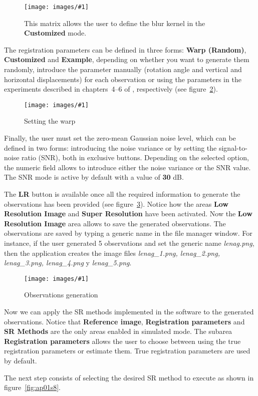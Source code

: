 \documentclass[11pt,a4paper]{article}
\newcommand{\figureimage}[4]{%
\begin{figure}[t]%
\begin{center}%
\texttt{[image: images/\#1]}%
\caption{#4}%
\label{#3}%
\end{center}%
\end{figure}%
} %
\begin{document}
\figureimage{s5}{width=0.5\textwidth}{fig:ap01s5}%
 {This matrix allows the user to define the blur kernel in the \textbf{Customized} mode.} 

The registration parameters can be defined in three forms: \textbf{Warp (Random)}, \textbf{Customized} and \textbf{Example}, depending on whether you want to  generate them randomly, introduce the parameter manually (rotation angle and vertical and horizontal displacements) for each observation or using the parameters in the experiments described in chapters~4--6 of \cite{VillenaThesis:11}, respectively (see figure~\ref{fig:ap01s6}).

\figureimage{s6}{width=0.75\textwidth}{fig:ap01s6}%
 {Setting the warp} 
 
Finally, the user must set the zero-mean Gaussian noise level, which can be defined in two forms: introducing the noise variance or by setting the signal-to-noise ratio (SNR), both in exclusive buttons. Depending on the selected option, the numeric field allows to introduce either the noise variance or the SNR value. The SNR mode is active by default with a value of \textbf{30} dB.
 
The \textbf{LR} button is available once all the required information to generate the observations has been provided (see figure~\ref{fig:ap01s7}). Notice how the areas \textbf{Low Resolution Image} and  \textbf{Super Resolution} have been activated. Now the \textbf{Low Resolution Image} area allows to save the generated observations. The observations are saved by typing a generic name in the file manager window. For instance, if the user generated 5 observations and set the generic name \textit{lenag.png}, then the application creates the image files \textit{lenag\_1.png, lenag\_2.png, lenag\_3.png, lenag\_4.png} y \textit{lenag\_5.png}.

\figureimage{s7}{width=\textwidth}{fig:ap01s7}%
 {Observations generation}
 
Now we can apply the SR methods  implemented in the software to the generated observations. Notice that \textbf{Reference image}, \textbf{Registration parameters} and \textbf{SR Methods} are the only areas enabled in simulated mode. The subarea  \textbf{Registration parameters} allows the user to choose between using the true registration parameters or estimate them. True registration parameters are used by default.
 
The next step consists of selecting the desired SR method to execute as shown in figure~\ref{fig:ap01s8}.
\end{document}
